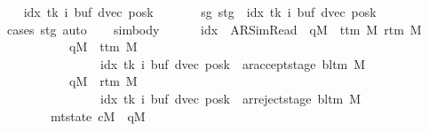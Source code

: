 \begin{isabellebody}
\ \ \isamarkupfalse%
\ idx\ tk\ i\ buf\ dvec\ posk\ \isanewline
\ \ \ \ \ \ sg{\isacharcolon}{\kern0pt}\ {\isachardoublequoteopen}stg\ {\isacharequal}{\kern0pt}\ {\isacharparenleft}{\kern0pt}idx{\isacharcomma}{\kern0pt}\ tk{\isacharcomma}{\kern0pt}\ i{\isacharcomma}{\kern0pt}\ buf{\isacharcomma}{\kern0pt}\ dvec{\isacharcomma}{\kern0pt}\ posk{\isacharparenright}{\kern0pt}{\isachardoublequoteclose}\isanewline
\ \ \ \ \isamarkupfalse%
\ {\isacharparenleft}{\kern0pt}cases\ stg{\isacharparenright}{\kern0pt}\ auto\isanewline
\ \ \isamarkupfalse%
\ sim{\isacharunderscore}{\kern0pt}body{\isacharcolon}{\kern0pt}\isanewline
\ \ \ \ \ \ {\isachardoublequoteopen}{\isacharparenleft}{\kern0pt}{\isacharparenleft}{\kern0pt}idx\ {\isacharequal}{\kern0pt}\ AR{\isacharunderscore}{\kern0pt}SimRead\ {\isasymand}\ qM{\isacharprime}{\kern0pt}\ {\isasymnotin}\ {\isacharbraceleft}{\kern0pt}t{\isacharunderscore}{\kern0pt}tm\ M{\isacharcomma}{\kern0pt}\ r{\isacharunderscore}{\kern0pt}tm\ M{\isacharbraceright}{\kern0pt}{\isacharparenright}{\kern0pt}\isanewline
\ \ \ \ \ \ \ \ \ \ {\isasymor}\ {\isacharparenleft}{\kern0pt}qM{\isacharprime}{\kern0pt}\ {\isacharequal}{\kern0pt}\ t{\isacharunderscore}{\kern0pt}tm\ M\isanewline
\ \ \ \ \ \ \ \ \ \ \ \ \ \ \ {\isasymand}\ {\isacharparenleft}{\kern0pt}idx{\isacharcomma}{\kern0pt}\ tk{\isacharcomma}{\kern0pt}\ i{\isacharcomma}{\kern0pt}\ buf{\isacharcomma}{\kern0pt}\ dvec{\isacharcomma}{\kern0pt}\ posk{\isacharparenright}{\kern0pt}\ {\isacharequal}{\kern0pt}\ ar{\isacharunderscore}{\kern0pt}accept{\isacharunderscore}{\kern0pt}stage\ {\isacharparenleft}{\kern0pt}bl{\isacharunderscore}{\kern0pt}tm\ M{\isacharparenright}{\kern0pt}{\isacharparenright}{\kern0pt}\isanewline
\ \ \ \ \ \ \ \ \ \ {\isasymor}\ {\isacharparenleft}{\kern0pt}qM{\isacharprime}{\kern0pt}\ {\isacharequal}{\kern0pt}\ r{\isacharunderscore}{\kern0pt}tm\ M\isanewline
\ \ \ \ \ \ \ \ \ \ \ \ \ \ \ {\isasymand}\ {\isacharparenleft}{\kern0pt}idx{\isacharcomma}{\kern0pt}\ tk{\isacharcomma}{\kern0pt}\ i{\isacharcomma}{\kern0pt}\ buf{\isacharcomma}{\kern0pt}\ dvec{\isacharcomma}{\kern0pt}\ posk{\isacharparenright}{\kern0pt}\ {\isacharequal}{\kern0pt}\ ar{\isacharunderscore}{\kern0pt}reject{\isacharunderscore}{\kern0pt}stage\ {\isacharparenleft}{\kern0pt}bl{\isacharunderscore}{\kern0pt}tm\ M{\isacharparenright}{\kern0pt}{\isacharparenright}{\kern0pt}{\isacharparenright}{\kern0pt}\isanewline
\ \ \ \ \ \ \ {\isasymand}\ mt{\isacharunderscore}{\kern0pt}state\ cM\ {\isacharequal}{\kern0pt}\ qM{\isacharprime}{\kern0pt}\isanewline

\end{isabellebody}
